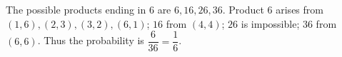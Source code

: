 The possible products ending in $6$ are $6,16,26,36$. Product $6$ arises from $(1,6),(2,3),(3,2),(6,1)$; $16$ from $(4,4)$; $26$ is impossible; $36$ from $(6,6)$. Thus the probability is $\dfrac{6}{36}=\boxed{\dfrac{1}{6}}$.

